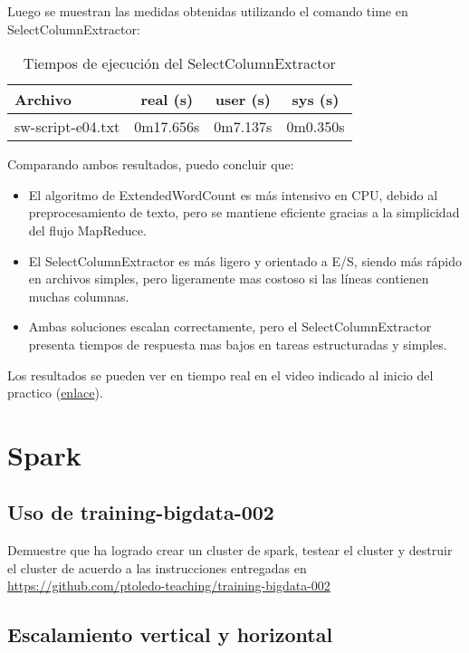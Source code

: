 \documentclass[12pt,letterpaper,twoside]{article}
\begin{document}
\noindent
Luego se muestran las medidas obtenidas utilizando el comando time en SelectColumnExtractor:

\begin{table}[h!]
\centering
\begin{tabular}{lccc}
\toprule
\textbf{Archivo} & \textbf{real (s)} & \textbf{user (s)} & \textbf{sys (s)} \\
\midrule
sw-script-e04.txt  & 0m17.656s  & 0m7.137s & 0m0.350s
\bottomrule
\end{tabular}
\caption{Tiempos de ejecución del SelectColumnExtractor}
\end{table}

\noindent
Comparando ambos resultados, puedo concluir que:
\begin{itemize}
    \item El algoritmo de ExtendedWordCount es más intensivo en CPU, debido al preprocesamiento de texto, pero se mantiene eficiente gracias a la simplicidad del flujo MapReduce.
    \item El SelectColumnExtractor es más ligero y orientado a E/S, siendo más rápido en archivos simples, pero ligeramente mas costoso si las líneas contienen muchas columnas.
    \item Ambas soluciones escalan correctamente, pero el SelectColumnExtractor presenta tiempos de respuesta mas bajos en tareas estructuradas y simples.
\end{itemize}

\noindent
Los resultados se pueden ver en tiempo real en el video indicado al inicio del practico ({\color{blue}\href{https://github.com/apache/hadoop}{enlace}}).

\newpage

\section{Spark}

\subsection{Uso de training-bigdata-002}

{\color{red} Demuestre que ha logrado crear un cluster de spark, testear el cluster y destruir el cluster de acuerdo a las instrucciones entregadas en \url{https://github.com/ptoledo-teaching/training-bigdata-002}}

\subsection{Escalamiento vertical y horizontal}
\end{document}
